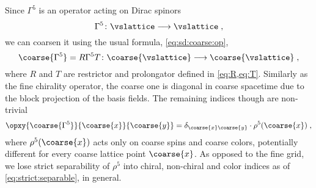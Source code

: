Since $\Gamma^5$ is an operator acting on Dirac spinors
\begin{equation}
\Gamma^5 \colon \vslattice \longrightarrow \vslattice \;,
\end{equation}
we can coarsen it using the usual formula, \cref{eq:sd:coarse:op},
\begin{equation}
\coarse{\Gamma^5} = R \Gamma^5 T \colon \coarse{\vslattice} \longrightarrow \coarse{\vslattice} \;,
\end{equation}
where $R$ and $T$ are restrictor and prolongator defined in \cref{eq:R,eq:T}.
Similarly as the fine chirality operator, the coarse one is diagonal in coarse spacetime due to the block projection of the basis fields.
The remaining indices though are non-trivial
\begin{equation}
\opxy{\coarse{\Gamma^5}}{\coarse{x}}{\coarse{y}} = \delta_{\coarse{x} \coarse{y}} \cdot \rho^5(\coarse{x}) \;,
\end{equation}
where $\rho^{5}(\coarse{x})$ acts only on coarse spins and coarse colors, potentially different for every coarse lattice point $\coarse{x}$.
As opposed to the fine grid, we lose strict separability of $\rho^5$ into chiral, non-chiral and color indices as of \cref{eq:strict:separable}, in general.

